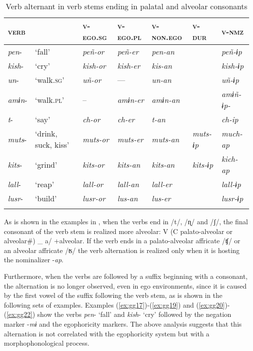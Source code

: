 \documentclass[output=paper]{langsci/langscibook}
\begin{document}
\begin{table}
\begin{tabularx}{\textwidth}{lQlllll}
\lsptoprule
\textsc{verb} & & \textsc{v-ego.sg} & \textsc{v-ego.pl} & \textsc{v-non.ego} & \textsc{v-dur} & \textsc{v-nmz}\\
\midrule
\textit{pen}- & ‘fall’ & \textit{peñ-or} & \textit{peñ-er} & \textit{pen-an} & & \textit{peñ-ɨp}\\
\textit{kish}- & ‘cry’ & \textit{kish-or} & \textit{kish-er} & \textit{kis-an} & & \textit{kish-ɨp}\\
\textit{un}- & `walk.\textsc{sg}' & \textit{uñ-or} & — & \textit{un-an} & & \textit{uñ-ɨp}\\
\textit{amɨn}- & `walk.\textsc{pl}' & – & \textit{amɨn-er} & \textit{amɨn-an} & & \textit{amɨñ-ɨp-}\\
\textit{t}- & ‘say’ & \textit{ch-or} & \textit{ch-er} & \textit{t-an} & & \textit{ch-ip}\\
\textit{muts}- & ‘drink, suck, kiss’ & \textit{muts-or} & \textit{muts-er} & \textit{muts-an} & \textit{muts-ɨp} & \textit{much-ap}\\
\textit{kits}- & ‘grind’ & \textit{kits-or} & \textit{kits-an} & \textit{kits-an} & \textit{kits-ɨp} & \textit{kich-ap}\\
\textit{lall}- & ‘reap’ & \textit{lall-or} & \textit{lall-an} & \textit{lall-er} & & \textit{lall-ɨp}\\
\textit{lusr}- & ‘build’ & \textit{lusr-or} & \textit{lus-an} & \textit{lus-er} & & \textit{lusr-ɨp}\\
\lspbottomrule
\end{tabularx}
\caption{Verb alternant in verb stems ending in palatal and alveolar consonants}
\label{tab:gg5}
\end{table}



As is shown in the examples in , when the verbs end in /t/, /ɳ/ and /ʃ/, the final consonant of the verb stem is realized more alveolar: V (C palato-alveolar or alveolar\#) \_ a/ +alveolar. If the verb ends in a palato-alveolar affricate /ʧ/ or an alveolar affricate /ʦ/ the verb alternation is realized only when it is hosting the nominalizer -\textit{ap}.

Furthermore, when the verbs are followed by a suffix beginning with a consonant, the alternation is no longer observed, even in ego environments, since it is caused by the first vowel of the suffix following the verb stem, as is shown in the following sets of examples. 
Examples (\ref{ex:gg17})-(\ref{ex:gg19}) and (\ref{ex:gg20})-(\ref{ex:gg22}) show the verbs \textit{pen}- ‘fall’ and \textit{kish}- ‘cry’ followed by the negation marker -\textit{mɨ} and the egophoricity markers. The above analysis suggests that this alternation is not correlated with the egophoricity system but with a morphophonological process. 
\end{document}
